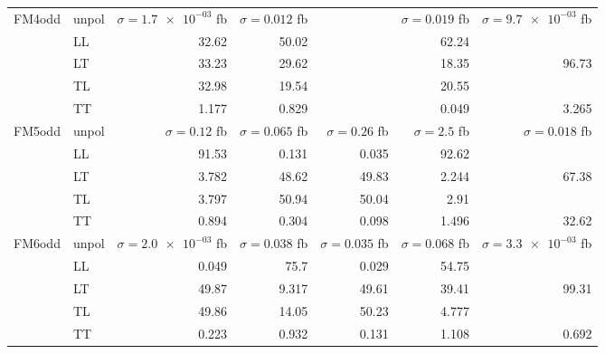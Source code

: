 \begin{table}[h]
{\begin{tabular}{llrrrrr}
\midrule
\multirow{5}{*}{FM4odd}
 & unpol & $\sigma = \num{1.7e-03}$ fb & $\sigma = \num{0.012}$ fb &  & $\sigma = \num{0.019}$ fb & $\sigma = \num{9.7e-03}$ fb \\
 & LL & \num{32.62} & \num{50.02} &  & \num{62.24} &  \\
 & LT & \num{33.23} & \num{29.62} &  & \num{18.35} & \num{96.73} \\
 & TL & \num{32.98} & \num{19.54} &  & \num{20.55} &  \\
 & TT & \num{1.177} & \num{0.829} &  & \num{0.049} & \num{3.265} \\
\midrule
\multirow{5}{*}{FM5odd}
 & unpol & $\sigma = \num{0.12}$ fb & $\sigma = \num{0.065}$ fb & $\sigma = \num{0.26}$ fb & $\sigma = \num{2.5}$ fb & $\sigma = \num{0.018}$ fb \\
 & LL & \num{91.53} & \num{0.131} & \num{0.035} & \num{92.62} &  \\
 & LT & \num{3.782} & \num{48.62} & \num{49.83} & \num{2.244} & \num{67.38} \\
 & TL & \num{3.797} & \num{50.94} & \num{50.04} & \num{2.91} &  \\
 & TT & \num{0.894} & \num{0.304} & \num{0.098} & \num{1.496} & \num{32.62} \\
\midrule
\multirow{5}{*}{FM6odd}
 & unpol & $\sigma = \num{2.0e-03}$ fb & $\sigma = \num{0.038}$ fb & $\sigma = \num{0.035}$ fb & $\sigma = \num{0.068}$ fb & $\sigma = \num{3.3e-03}$ fb \\
 & LL & \num{0.049} & \num{75.7} & \num{0.029} & \num{54.75} &  \\
 & LT & \num{49.87} & \num{9.317} & \num{49.61} & \num{39.41} & \num{99.31} \\
 & TL & \num{49.86} & \num{14.05} & \num{50.23} & \num{4.777} &  \\
 & TT & \num{0.223} & \num{0.932} & \num{0.131} & \num{1.108} & \num{0.692} \\
\bottomrule
\end{tabular}
}%
\end{table}
\newpage
